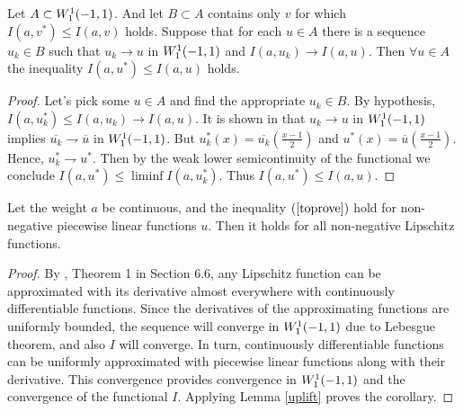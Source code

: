 \begin{lm}
\label{uplift}
Let $A \subset W_1^1(-1,1)$.
And let $B \subset A$ contains only $v$ for which $I(a, v^*) \le I(a, v)$ holds.
Suppose that for each $u \in A$
there is a sequence $u_k \in B$ such that $u_k \to u$ in $W_1^1(-1, 1)$ and
$I(a, u_k) \to I(a, u)$.
Then $\forall u \in A$ the inequality $I(a, u^*) \le I(a, u)$ holds.
\end{lm}
\begin{proof}
Let's pick some $u \in A$ and find the appropriate $u_k \in B$.
By hypothesis, $I(a, u_k^*) \le I(a, u_k) \to I(a, u)$.
It is shown in \cite[Theorem 1]{Br} that $u_k \to u$ in $W_1^1(-1, 1)$ implies
$\overline{u_k} \rightharpoondown \overline{u}$ in $W_1^1(-1, 1)$.
But $u_k^*( x ) = \overline{u_k}( \frac{x - 1}{2} )$ and
$u^*( x ) = \overline{u}( \frac{x - 1}{2} )$.
Hence, $u_k^* \rightharpoondown u^*$.
Then by the weak lower semicontinuity of the functional we conclude $I(a, u^*) \le \liminf I(a, u_k^*)$.
Thus $I(a, u^*) \le I(a, u)$.
\end{proof}

\begin{cor}
Let the weight $a$ be continuous, and the inequality $(\ref{toprove})$ hold for non-negative piecewise linear functions $u$.
Then it holds for all non-negative Lipschitz functions.
\end{cor}
\begin{proof}
By \cite{Gariepy}, Theorem 1 in Section 6.6, any Lipschitz function can be approximated with its derivative
almost everywhere with continuously differentiable functions.
Since the derivatives of the approximating functions are uniformly bounded,
the sequence will converge in $W_1^1(-1, 1)$ due to Lebesgue theorem,
and also $I$ will converge.
In turn, continuously differentiable functions can be uniformly approximated with piecewise linear functions
along with their derivative.
This convergence provides convergence in $W_1^1(-1, 1)$ and the convergence of the functional $I$.
Applying Lemma \ref{uplift} proves the corollary.
\end{proof}


